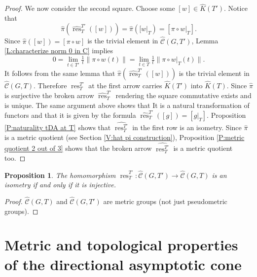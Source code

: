 \documentclass[12pt]{amsart}
\newtheorem{prop}{Proposition}[section]
\theoremstyle{definition}
\def\res{\operatorname{res}}
\def\tC{\hat{\mathcal{C}}}
\begin{document}
\begin{proof}
We now consider the second square.
Choose some $[w] \in \hat{K}(T')$.
Notice that
\[
\hat{\pi}(\widehat{\res}^{T'}_T([w])) = \hat{\pi}([w|_T) = [\pi \circ w|_T]. %
\]
Since $\hat{\pi}([w])=[\pi \circ w]$ is the trivial element in $\tC(G,T')$, Lemma \ref{L:characterize norm 0 in C} implies 
\[
0 = \lim_{t \in T'} \tfrac{1}{t}\| \pi \circ w(t)\|= \lim_{t \in T} \tfrac{1}{t}\| \pi \circ w|_T(t)\|.
\]
It follows from the same lemma that $\hat{\pi}(\widehat{\res}^{T'}_T([w]))$ is the trivial element in $\tC(G,T)$.
Therefore $\res^{T'}_T$ at the first arrow carries $\hat{K}(T')$ into $\hat{K}(T)$.
Since $\hat{\pi}$ is surjective the broken arrow $\widehat{\res}^{T'}_T$ rendering the square commutative exists and is unique.
The same argument above shows that It is a natural transformation of functors and that it is given by the formula $\widehat{\res}^{T'}_T([g])=[g|_T]$.
Proposition \ref{P:naturality tDA at T} shows that $\widehat{\res^{T'}_T}$ in the first row is an isometry.
Since $\hat{\pi}$ is a metric quotient (see Section \ref{V:hat pi construction}), Proposition \ref{P:metric quotient 2 out of 3} shows that the broken arrow $\widehat{\res^{T'}_T}$ is a metric quotient too.
\end{proof}





\begin{prop}\label{P:restriction injective => isometry} %
The homomorphism $\widehat{\res}^{T'}_T \colon \tC(G,T') \to \tC(G,T)$ is an isometry if and only if it is injective.
\end{prop}

\begin{proof}
$\tC(G,T)$ and $\tC(G,T')$ are metric groups (not just pseudometric groups).
\end{proof}

















\section{Metric and topological properties of the directional asymptotic cone}
\end{document}
